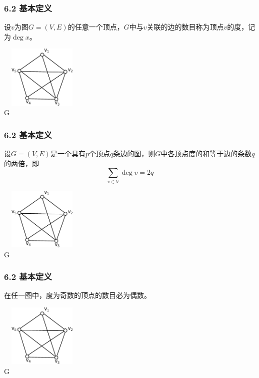 \documentclass{beamer}
\begin{document}
\begin{CJK*}{UTF8}{gbsn}
\begin{frame}
  \frametitle{6.2 基本定义}
  \begin{definition6.2.5}
    设$v$为图$G=(V,E)$的任意一个顶点，$G$中与$v$关联的边的数目称为顶点$v$的\alert{度}，记为$\deg x$。
  \end{definition6.2.5}
\centering
\includegraphics[width=4cm,height=3cm]{subgraph1} \\  G   
\end{frame}

\begin{frame}
  \frametitle{6.2 基本定义}
  \begin{theorem6.2.1}
    设$G=(V,E)$是一个具有$p$个顶点$q$条边的图，则$G$中各顶点度的和等于边的条数$q$的两倍，即
        \begin{equation*}
      \sum_{v \in V}\deg v = 2q
    \end{equation*}
  \end{theorem6.2.1}
\centering
\includegraphics[width=4cm,height=3cm]{subgraph1} \\  G   
\end{frame}


\begin{frame}
  \frametitle{6.2 基本定义}
  \begin{theorem6.2.2}
       在任一图中，度为奇数的顶点的数目必为偶数。
  \end{theorem6.2.2}
\centering
\includegraphics[width=4cm,height=3cm]{subgraph1} \\  G 
\end{frame}


\end{CJK*}
\end{document}
